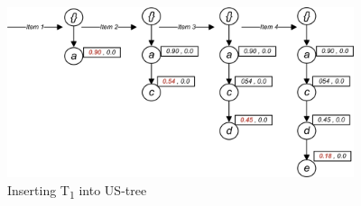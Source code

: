 %
%
\begin{figure}
  \centering
	\includegraphics[width=.8\textwidth,height=5cm]{images/sim_01.jpg}  
	\caption{Inserting T\textsubscript{1} into US-tree}
	\label{figure:t1}
\end{figure}

